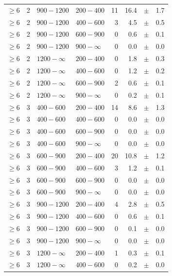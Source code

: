 \begin{table}[!h]
\begin{tabular}{rrllrrcl}
$\geq 6$ & 2 & $ 900-1200$ & $200-400$ &     11 &     16.4 &$\pm$&    1.7 \\
$\geq 6$ & 2 & $ 900-1200$ & $400-600$ &      3 &      4.5 &$\pm$&    0.5 \\
$\geq 6$ & 2 & $ 900-1200$ & $600-900$ &      0 &      0.6 &$\pm$&    0.1 \\
$\geq 6$ & 2 & $ 900-1200$ & $900-\infty$ &      0 &      0.0 &$\pm$&    0.0 \\
$\geq 6$ & 2 & $1200- \infty$ & $200-400$ &      0 &      1.8 &$\pm$&    0.3 \\
$\geq 6$ & 2 & $1200- \infty$ & $400-600$ &      0 &      1.2 &$\pm$&    0.2 \\
$\geq 6$ & 2 & $1200- \infty$ & $600-900$ &      2 &      0.6 &$\pm$&    0.1 \\
$\geq 6$ & 2 & $1200- \infty$ & $900-\infty$ &      0 &      0.2 &$\pm$&    0.1 \\
$\geq 6$ & 3 & $ 400- 600$ & $200-400$ &     14 &      8.6 &$\pm$&    1.3 \\
$\geq 6$ & 3 & $ 400- 600$ & $400-600$ &      0 &      0.0 &$\pm$&    0.0 \\
$\geq 6$ & 3 & $ 400- 600$ & $600-900$ &      0 &      0.0 &$\pm$&    0.0 \\
$\geq 6$ & 3 & $ 400- 600$ & $900-\infty$ &      0 &      0.0 &$\pm$&    0.0 \\
$\geq 6$ & 3 & $ 600- 900$ & $200-400$ &     20 &     10.8 &$\pm$&    1.2 \\
$\geq 6$ & 3 & $ 600- 900$ & $400-600$ &      3 &      1.2 &$\pm$&    0.1 \\
$\geq 6$ & 3 & $ 600- 900$ & $600-900$ &      0 &      0.0 &$\pm$&    0.0 \\
$\geq 6$ & 3 & $ 600- 900$ & $900-\infty$ &      0 &      0.0 &$\pm$&    0.0 \\
$\geq 6$ & 3 & $ 900-1200$ & $200-400$ &      4 &      2.8 &$\pm$&    0.5 \\
$\geq 6$ & 3 & $ 900-1200$ & $400-600$ &      0 &      0.6 &$\pm$&    0.1 \\
$\geq 6$ & 3 & $ 900-1200$ & $600-900$ &      0 &      0.1 &$\pm$&    0.0 \\
$\geq 6$ & 3 & $ 900-1200$ & $900-\infty$ &      0 &      0.0 &$\pm$&    0.0 \\
$\geq 6$ & 3 & $1200- \infty$ & $200-400$ &      1 &      0.3 &$\pm$&    0.1 \\
$\geq 6$ & 3 & $1200- \infty$ & $400-600$ &      0 &      0.2 &$\pm$&    0.0 \\

\end{tabular}
\end{table}
